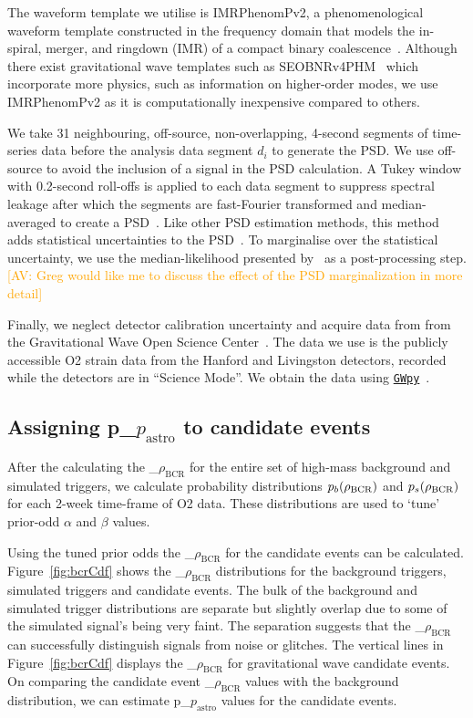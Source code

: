 \documentclass[%
 nofootinbib,
 amsmath,amssymb,
 aps,
 twocolumn
]{revtex4-2}
\newcommand{\gwpy}{{\sc \href{https://gwpy.github.io/}{\texttt{GWpy}}}\xspace}
\newcommand{\imrphenomp}{{\sc IMRPhenomPv2}\xspace}
\newcommand{\seob}{{\sc SEOBNRv4PHM}\xspace}
\newcommand{\fancytext}[1]{{\relax\ifmmode#1\else $#1$\fi}\xspace}
\newcommand{\mathcmd}[1]{{\sc \relax\ifmmode#1\else $#1$\fi}\xspace}
\newcommand{\bcr}{\mathcmd{\rho_\text{BCR}}}
\newcommand{\pastro}{\fancytext{p_\text{astro}}}
\newcommand{\avi}[1]{\textcolor{orange}{[AV: #1]}}
\begin{document}
The waveform template we utilise is \imrphenomp, a phenomenological waveform template constructed in the frequency domain that models the in-spiral, merger, and ringdown (IMR) of a compact binary coalescence~\citep{khan2016frequency}. Although there exist gravitational wave templates such as \seob~\cite{seobnrv4phm} which incorporate more physics, such as information on higher-order modes, we use \imrphenomp as it is computationally inexpensive compared to others.

We take 31 neighbouring, off-source, non-overlapping,  4-second  segments of time-series data before the analysis data segment $d_i$ to generate the PSD. We use off-source to avoid the inclusion of a signal in the PSD calculation. A Tukey window with 0.2-second roll-offs is applied to each data segment to suppress spectral leakage after which the segments are fast-Fourier transformed and median-averaged to create a PSD~\cite{ligo_psd}. Like other PSD estimation methods, this method adds statistical uncertainties to the PSD~\cite{psd_student_t, chatziioannou2019noise}. To marginalise over the statistical uncertainty, we use the median-likelihood presented by~\citet{psd_student_t} as a post-processing step. 
\avi{Greg would like me to discuss the effect of the PSD marginalization in more detail}

Finally, we neglect detector calibration uncertainty and acquire data from from the Gravitational Wave Open Science Center~\cite{GWOSC}. The data we use is the publicly accessible O2 strain data from the Hanford and Livingston detectors, recorded while the detectors are in ``Science Mode''. We obtain the data using \gwpy~\cite{gwpy}. 

\subsection{Assigning \pastro to candidate events}
After the calculating the \bcr for the entire set of high-mass background and simulated triggers, we calculate probability distributions $p_b(\bcr)$ and $p_s(\bcr)$ for each 2-week time-frame of O2 data. These distributions are used to `tune' prior-odd $\alpha$ and $\beta$ values.

Using the tuned prior odds the \bcr for the candidate events can be calculated. Figure~\ref{fig:bcrCdf} shows the \bcr distributions for the background triggers, simulated triggers and candidate events. The bulk of the background and simulated trigger distributions are separate but slightly overlap due to some of the simulated signal's being very faint. The separation suggests that the \bcr can successfully distinguish signals from noise or glitches. The vertical lines in Figure~\ref{fig:bcrCdf} displays the \bcr for gravitational wave candidate events. On comparing the candidate event \bcr values with the background distribution, we can estimate \pastro values for the candidate events. 
\end{document}
